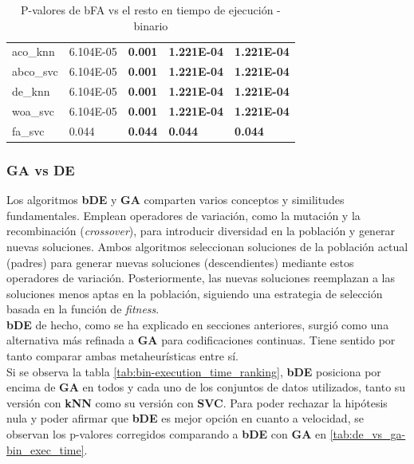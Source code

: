 \begin{table}[htb]
\begin{tabular}{lllll}
        aco\_knn  & 6.104E-05 & \textbf{0.001} & \textbf{1.221E-04} & \textbf{1.221E-04} \\
        abco\_svc & 6.104E-05 & \textbf{0.001} & \textbf{1.221E-04} & \textbf{1.221E-04} \\
        de\_knn   & 6.104E-05 & \textbf{0.001} & \textbf{1.221E-04} & \textbf{1.221E-04} \\
        woa\_svc  & 6.104E-05 & \textbf{0.001} & \textbf{1.221E-04} & \textbf{1.221E-04} \\
        fa\_svc   & 0.044     & \textbf{0.044} & \textbf{0.044}     & \textbf{0.044}     \\
        \bottomrule
    \end{tabular}
    \caption{P-valores de bFA vs el resto en tiempo de ejecución - binario}
    \label{tab:fa_vs_rest-bin_exec_time}
\end{table}

\subsubsection{GA vs DE}
Los algoritmos \textbf{bDE} y \textbf{GA} comparten varios conceptos y similitudes fundamentales. Emplean operadores de variación, como la mutación y la recombinación (\textit{crossover}), para introducir diversidad en la población y generar nuevas soluciones. Ambos algoritmos seleccionan soluciones de la población actual (padres) para generar nuevas soluciones (descendientes) mediante estos operadores de variación. Posteriormente, las nuevas soluciones reemplazan a las soluciones menos aptas en la población, siguiendo una estrategia de selección basada en la función de \textit{fitness}.\\[6pt]
\textbf{bDE} de hecho, como se ha explicado en secciones anteriores, surgió como una alternativa más refinada a \textbf{GA} para codificaciones continuas. Tiene sentido por tanto comparar ambas metaheurísticas entre sí.\\[6pt]

Si se observa la tabla \ref{tab:bin-execution_time_ranking}, \textbf{bDE} posiciona por encima de \textbf{GA} en todos y cada uno de los conjuntos de datos utilizados, tanto su versión con \textbf{kNN} como su versión con \textbf{SVC}. Para poder rechazar la hipótesis nula y poder afirmar que \textbf{bDE} es mejor opción en cuanto a velocidad, se observan los p-valores corregidos comparando a \textbf{bDE} con \textbf{GA} en \ref{tab:de_vs_ga-bin_exec_time}.

